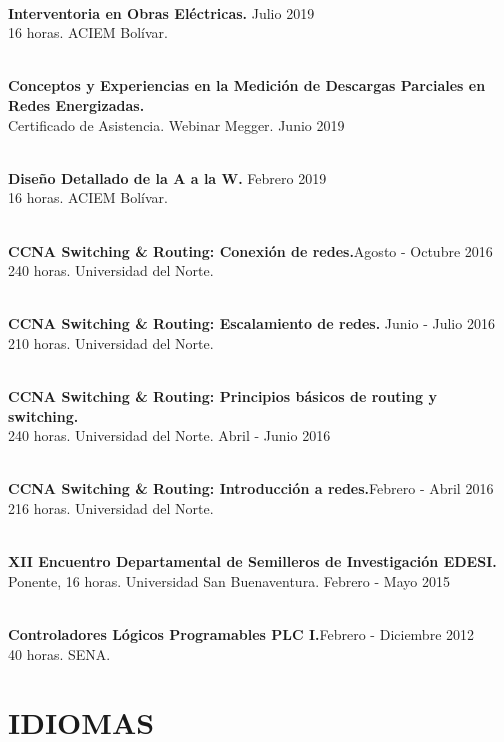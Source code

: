 \documentclass[margin]{res}
\begin{document}
\begin{resume}
\\\textbf{Interventoria en Obras Eléctricas.} \hfill Julio 2019
\\ 16 horas. ACIEM Bolívar. 

\\\textbf{Conceptos y Experiencias en la Medición de Descargas Parciales en Redes Energizadas.} 
\\ Certificado de Asistencia. Webinar Megger. \hfill Junio 2019

\\\textbf{Diseño Detallado de la A a la W.} \hfill Febrero 2019
\\16 horas. ACIEM Bolívar.

\\\textbf{CCNA Switching \& Routing: Conexión de redes.}\hfill Agosto - Octubre 2016
\\240 horas. Universidad del Norte. 

\\\textbf{CCNA Switching \& Routing: Escalamiento de redes.} \hfill Junio - Julio 2016
\\210 horas. Universidad del Norte. 

\\\textbf{CCNA Switching \& Routing: Principios básicos de routing y switching.}
\\240 horas. Universidad del Norte. \hfill Abril - Junio 2016

\\\textbf{CCNA Switching \& Routing: Introducción a redes.}\hfill Febrero - Abril 2016
\\216 horas. Universidad del Norte. 

\\\textbf{XII Encuentro Departamental de Semilleros de Investigación EDESI.}
\\Ponente, 16 horas. Universidad San Buenaventura. \hfill Febrero - Mayo 2015

\\\textbf{Controladores Lógicos Programables PLC I.}\hfill Febrero - Diciembre 2012
\\40 horas. SENA. 

\section{IDIOMAS}


\end{resume}
\end{document}
